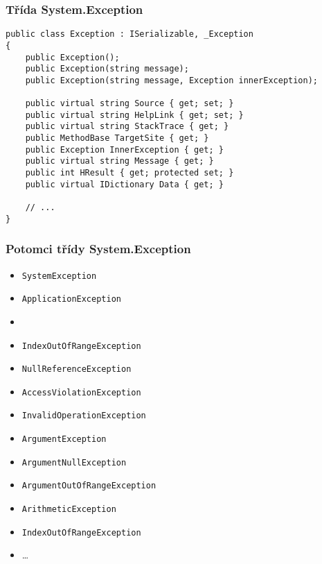 \begin{frame}[fragile]
\frametitle{Třída System.Exception}
\begin{noteblock}{}
\begin{lstlisting}
public class Exception : ISerializable, _Exception
{
    public Exception();
    public Exception(string message);
    public Exception(string message, Exception innerException);

    public virtual string Source { get; set; }
    public virtual string HelpLink { get; set; }
    public virtual string StackTrace { get; }
    public MethodBase TargetSite { get; }
    public Exception InnerException { get; }
    public virtual string Message { get; }
    public int HResult { get; protected set; }
    public virtual IDictionary Data { get; }
    
    // ...
}
\end{lstlisting}
\end{noteblock}

\end{frame}



\begin{frame}[fragile]
\frametitle{Potomci třídy System.Exception}
\begin{noteblock}{}
\begin{itemize}
\item \lstinline|SystemException|
\item \lstinline|ApplicationException|
\item[]
\item \lstinline|IndexOutOfRangeException|
\item \lstinline|NullReferenceException|
\item \lstinline|AccessViolationException|
\item \lstinline|InvalidOperationException|
\item \lstinline|ArgumentException|
\item \lstinline|ArgumentNullException|
\item \lstinline|ArgumentOutOfRangeException|
\item \lstinline|ArithmeticException|
\item \lstinline|IndexOutOfRangeException|
\item \ldots
\end{itemize}
\end{noteblock}

\end{frame}




